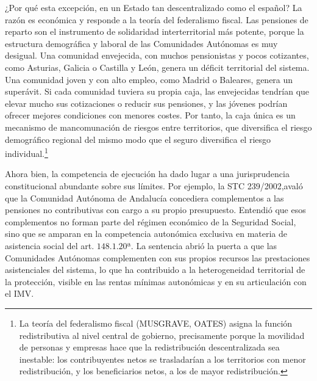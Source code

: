 \documentclass[10pt,a4paper]{article}
\begin{document}
¿Por qué esta excepción, en un Estado tan descentralizado como el español? La razón es económica y responde a la teoría del federalismo fiscal. Las pensiones de reparto son el instrumento de solidaridad interterritorial más potente, porque la estructura demográfica y laboral de las Comunidades Autónomas es muy desigual. Una comunidad envejecida, con muchos pensionistas y pocos cotizantes, como Asturias, Galicia o Castilla y León, genera un déficit territorial del sistema. Una comunidad joven y con alto empleo, como Madrid o Baleares, genera un superávit. Si cada comunidad tuviera su propia caja, las envejecidas tendrían que elevar mucho sus cotizaciones o reducir sus pensiones, y las jóvenes podrían ofrecer mejores condiciones con menores costes. Por tanto, la caja única es un mecanismo de mancomunación de riesgos entre territorios, que diversifica el riesgo demográfico regional del mismo modo que el seguro diversifica el riesgo individual.\footnote{La teoría del federalismo fiscal (MUSGRAVE, OATES) asigna la función redistributiva al nivel central de gobierno, precisamente porque la movilidad de personas y empresas hace que la redistribución descentralizada sea inestable: los contribuyentes netos se trasladarían a los territorios con menor redistribución, y los beneficiarios netos, a los de mayor redistribución.
}

Ahora bien, la competencia de ejecución ha dado lugar a una jurisprudencia constitucional abundante sobre sus límites. Por ejemplo, la STC 239/2002,avaló que la Comunidad Autónoma de Andalucía concediera complementos a las pensiones no contributivas con cargo a su propio presupuesto. Entendió que esos complementos no forman parte del régimen económico de la Seguridad Social, sino que se amparan en la competencia autonómica exclusiva en materia de asistencia social del art. $148.1.20$ª. La sentencia abrió la puerta a que las Comunidades Autónomas complementen con sus propios recursos las prestaciones asistenciales del sistema, lo que ha contribuido a la heterogeneidad territorial de la protección, visible en las rentas mínimas autonómicas y en su articulación con el IMV.
\end{document}
